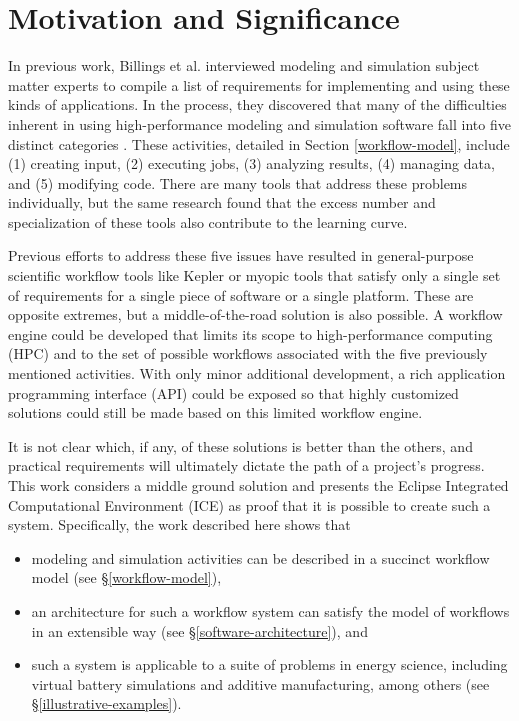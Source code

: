 \section{Motivation and Significance}\label{motivation-and-significance}

In previous work, Billings et al. interviewed modeling and simulation subject
matter experts to compile a list of requirements for implementing and using
these kinds of applications. In the process, they discovered that many of the
difficulties inherent in using high-performance modeling and simulation
software fall into five distinct categories \cite{billings_designing_2009}.
These activities, detailed in Section \ref{workflow-model}, include (1)
creating input, (2) executing jobs, (3) analyzing results, (4) managing data,
and (5) modifying code. There are many tools that address these problems
individually, but the same research found that the excess number and
specialization of these tools also contribute to the learning curve.

Previous efforts to address these five issues have resulted in general-purpose
scientific workflow tools like Kepler \cite{ludascher_scientific_2006} or
myopic tools that satisfy only a single set of requirements for a single piece
of software or a single platform. These are opposite extremes, but a
middle-of-the-road solution is also possible. A workflow engine could be
developed that limits its scope to high-performance computing (HPC) and to the
set of possible workflows associated with the five previously mentioned
activities. With only minor additional development, a rich application
programming interface (API) could be exposed so that highly customized
solutions could still be made based on this limited workflow engine.

It is not clear which, if any, of these solutions is better than the
others, and practical requirements will ultimately dictate the path of a
project's progress. This work considers a middle ground solution and
presents the Eclipse Integrated Computational Environment (ICE) as proof
that it is possible to create such a system. Specifically, the work
described here shows that

\begin{itemize}
\item
  modeling and simulation activities can be described in a succinct
  workflow model (see \S \ref{workflow-model}),
\item
  an architecture for such a workflow system can satisfy the model of
  workflows in an extensible way (see \S \ref{software-architecture}), and 
\item
  such a system is applicable to a suite of problems in energy science,
  including virtual battery simulations and additive manufacturing, 
  among others (see \S \ref{illustrative-examples}).
\end{itemize}

